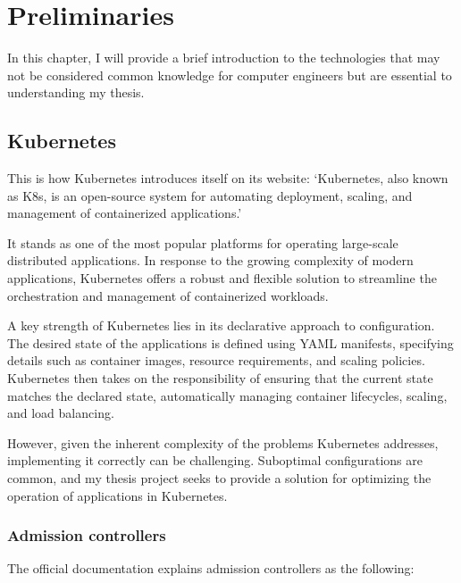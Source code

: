 \setlength{\parindent}{0pt}
\setlength{\parskip}{0.6em}

\chapter{Preliminaries}
\label{chap:prerequisites}

In this chapter, I will provide a brief introduction to the technologies that may not be considered common knowledge for computer engineers but are essential to understanding my thesis.

\section{Kubernetes}

This is how Kubernetes introduces itself on its website\cite{K8s}: `Kubernetes, also known as K8s, is an open-source system for automating deployment, scaling, and management of containerized applications.'

It stands as one of the most popular platforms for operating large-scale distributed applications. In response to the growing complexity of modern applications, Kubernetes offers a robust and flexible solution to streamline the orchestration and management of containerized workloads.

A key strength of Kubernetes lies in its declarative approach to configuration. The desired state of the applications is defined using YAML manifests, specifying details such as container images, resource requirements, and scaling policies. Kubernetes then takes on the responsibility of ensuring that the current state matches the declared state, automatically managing container lifecycles, scaling, and load balancing.

However, given the inherent complexity of the problems Kubernetes addresses, implementing it correctly can be challenging. Suboptimal configurations are common, and my thesis project seeks to provide a solution for optimizing the operation of applications in Kubernetes.

\subsection{Admission controllers}

The official documentation\cite{K8sAdmissionOfficial} explains admission controllers as the following:

